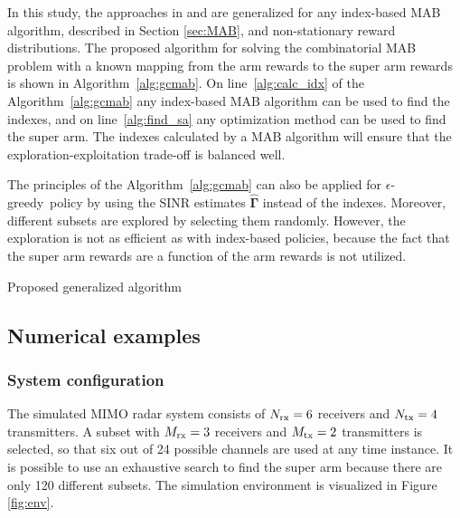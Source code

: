 \documentclass[english, 12pt, a4paper, elec, utf8, a-1b, online]{aaltothesis}
\numberwithin{equation}{section}
\newcommand{\egreedy}{$\epsilon$-greedy~}
\newcommand{\vsinrb}{\widehat{\boldsymbol{\Gamma}}}
\begin{document}
In this study, the approaches in \cite{Mukherjee2012} and \cite{Kuai2019} are generalized for any index-based MAB algorithm, described in Section \ref{sec:MAB}, and non-stationary reward distributions.
The proposed algorithm for solving the combinatorial MAB problem with a known mapping from the arm rewards to the super arm rewards is shown in Algorithm~\ref{alg:gcmab}.
On line~\ref{alg:calc_idx} of the Algorithm~\ref{alg:gcmab} any index-based MAB algorithm can be used to find the indexes, and on line~\ref{alg:find_sa} any optimization method can be used to find the super arm.
The indexes calculated by a MAB algorithm will ensure that the exploration-exploitation trade-off is balanced well.

The principles of the Algorithm~\ref{alg:gcmab} can also be applied for \egreedy policy by using the SINR estimates $\vsinrb$ instead of the indexes.
Moreover, different subsets are explored by selecting them randomly.
However, the exploration is not as efficient as with index-based policies, because the fact that the super arm rewards are a function of the arm rewards is not utilized.

\begin{algorithm}[h]
\SetAlgoLined
{}
\caption{Proposed generalized algorithm}
\label{alg:gcmab}
\end{algorithm}

\subsection{Numerical examples}
\label{sec:sim}


\subsubsection{System configuration}
\label{sec:sys_conf}
The simulated MIMO radar system consists of ${N_{\text{rx}}}=6$ receivers and ${N_{\text{tx}}}=4$ transmitters.
A subset with ${M_{\text{rx}}}=3$ receivers and ${M_{\text{tx}}}=2$ transmitters is selected, so that six out of 24 possible channels are used at any time instance.
It is possible to use an exhaustive search to find the super arm because there are only 120 different subsets.
The simulation environment is visualized in Figure \ref{fig:env}.
\end{document}
